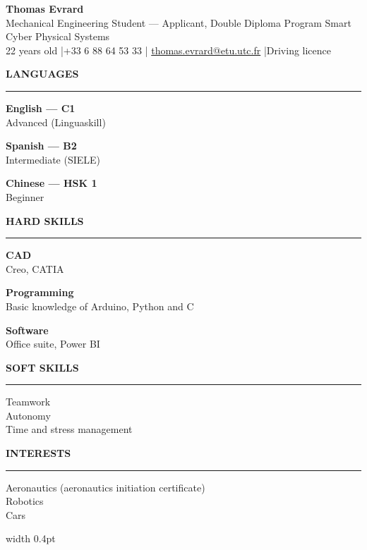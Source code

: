 \documentclass[10pt,a4paper]{article}
\newcommand{\sect}[1]{%
  \vspace{7pt}%
  {\large\bfseries\color{main}\MakeUppercase{#1}}\\[-3pt]
  {\color{main}\rule{\linewidth}{0.6pt}}\par\vspace{3pt}}
\newcommand{\side}[2]{\textbf{#1}\\{\small #2}\par\vspace{4pt}}
\begin{document}
{\Huge\bfseries\color{main} Thomas Evrard}\\[3pt]
{\large Mechanical Engineering Student --- Applicant, Double Diploma Program Smart Cyber Physical Systems}\\[3pt]
{\small\color{soft}
22 years old \quad|\quad +33 6 88 64 53 33 \quad|\quad
\href{mailto:thomas.evrard@etu.utc.fr}{thomas.evrard@etu.utc.fr} \quad|\quad Driving licence}

\vspace{4pt}

\begin{minipage}[t]{0.29\textwidth}

\sect{Languages}
\side{English --- C1}{Advanced (Linguaskill)}
\side{Spanish --- B2}{Intermediate (SIELE)}
\side{Chinese --- HSK 1}{Beginner}

\sect{Hard Skills}
\side{CAD}{Creo, CATIA}
\side{Programming}{Basic knowledge of Arduino, Python and C}
\side{Software}{Office suite, Power BI}

\sect{Soft Skills}
Teamwork\\
Autonomy\\
Time and stress management

\sect{Interests}
Aeronautics (aeronautics initiation certificate)\\
Robotics\\
Cars

\end{minipage}%
\hspace{0.015\textwidth}%
{\color{main}\vrule width 0.4pt}%
\hspace{0.02\textwidth}%
\end{document}
